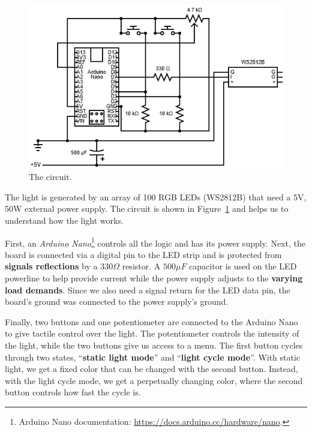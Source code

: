 \documentclass[sn-mathphys,Numbered]{sn-jnl}
\theoremstyle{thmstyleone}%
\theoremstyle{thmstyletwo}%
\theoremstyle{thmstylethree}%
\begin{document}
\begin{figure}[H]
	\centering
	\includegraphics[scale=0.55, keepaspectratio]{img/project_img/circuit-light.png}
	\caption{The circuit.}
	\label{fig:light-circuit}
\end{figure}





The light is generated by an array of 100 RGB LEDs (WS2812B) that need a 5V, 50W external power supply. 
The circuit is shown in Figure~\ref{fig:light-circuit} and helps us to understand how the light works. 

First, an \emph{Arduino Nano}\footnote{Arduino Nano documentation: \url{https://docs.arduino.cc/hardware/nano}.} controls all the logic and has its power supply.  Next, the board is connected via a digital pin to the LED strip and is protected  from \textbf{signals reflections} by a $330\Omega$ resistor. A $500 \mu F$ capacitor is used on the LED powerline to help provide current 
while the power supply adjusts to the \textbf{varying load demands}. Since we also need a signal return for the LED data pin, the board's ground was  connected to the power supply's ground. 

Finally, two buttons and one potentiometer are connected to the Arduino Nano to give tactile control over the light.  The potentiometer controls the intensity of the light, while the two buttons give us access to a menu. The first button cycles through two states, ``\textbf{static light mode}'' and ``\textbf{light cycle mode}''.  With static light, we get a fixed color that can be changed with the second button. Instead, with the light cycle mode, we get a perpetually changing color, where the second button controls how fast the cycle is.
\end{document}
